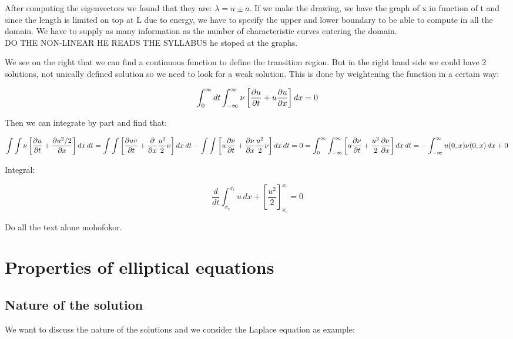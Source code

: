 After computing the eigenvectors we found that they are: $\lambda = u\pm a$. If we make the drawing, we have the graph of x in function of t and since the length is limited on top at L due to energy, we have to specify the upper and lower boundary to be able to compute in all the domain. We have to supply as many information as the number of characteristic curves entering the domain. \\

DO THE NON-LINEAR HE READS THE SYLLABUS he stoped at the graphs. 

We see on the right that we can find a continuous function to define the transition region. But in the right hand side we could have 2 solutions, not unically defined solution so we need to look for a weak solution. This is done by weightening the function in a certain way: 

\begin{equation}
\int _0 ^\infty dt \int _{-\infty}^\infty \nu \left[\frac{\partial u}{\partial t} + u \frac{\partial u }{\partial x}\right] dx = 0 
\end{equation}

Then we can integrate by part and find that: 

\begin{equation}
\int \int \nu \left[ \frac{\partial u}{\partial t} +\frac{\partial u^2/2}{\partial x}\right] dx\, dt = \int \int \left[ \frac{\partial uv}{\partial t} + \frac{\partial}{\partial x} \frac{u^2}{2} \nu  \right]dx\, dt - \int \int \left[ u\frac{\partial \nu}{\partial t} + \frac{\partial \nu}{\partial x} \frac{u^2}{2} \nu  \right]dx\, dt  =0 =\int _0^\infty  \int _{-\infty}^\infty \left[u \frac{\partial \nu}{\partial t} + \frac{u^2}{2}\frac{\partial \nu }{\partial x}\right] dx\, dt = -\int _{-\infty}^\infty u(0,x)\nu (0,x) \, dx +0
\end{equation}

Integral: 

\begin{equation}
\frac{d}{dt} \int _{x_e}^{x_r} u \, dx + \left[ \frac{u^2}{2}\right]_{x_e}^{x_r} = 0 
\end{equation}

Do all the text alone mohofokor. 

\section{Properties of elliptical equations}
\subsection{Nature of the solution}
We want to discuss the nature of the solutions and we consider the Laplace equation as example: 

